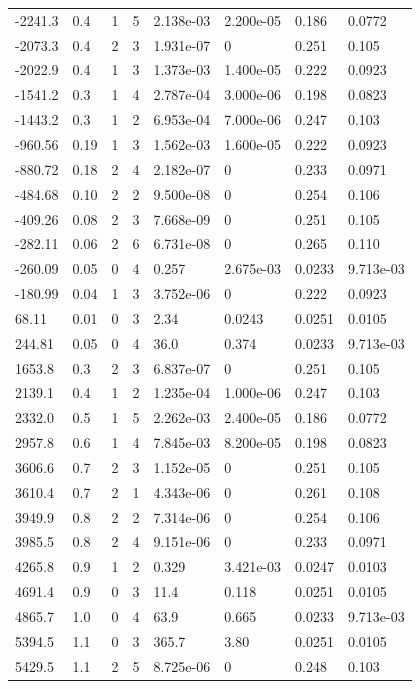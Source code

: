 \documentclass[preview]{standalone}
\begin{document}
{{\begin{tabular}{L{1.2cm}C{1.2cm} C{0.3cm}C{0.5cm} C{1.4cm}C{1.4cm} C{1.4cm}C{1.4cm}}
  -2241.3  &   0.4  & 1     &  5 &  2.138e-03  & 2.200e-05  & 0.186 &  0.0772   \\ 
  -2073.3  &   0.4  & 2     &  3 &  1.931e-07  & 0  & 0.251 &  0.105   \\ 
  -2022.9  &   0.4  & 1     &  3 &  1.373e-03  & 1.400e-05  & 0.222 &  0.0923   \\ 
  -1541.2  &   0.3  & 1     &  4 &  2.787e-04  & 3.000e-06  & 0.198 &  0.0823   \\ 
  -1443.2  &   0.3  & 1     &  2 &  6.953e-04  & 7.000e-06  & 0.247 &  0.103   \\ 
  -960.56  &  0.19  & 1     &  3 &  1.562e-03  & 1.600e-05  & 0.222 &  0.0923   \\ 
  -880.72  &  0.18  & 2     &  4 &  2.182e-07  & 0  & 0.233 &  0.0971   \\ 
  -484.68  &  0.10  & 2     &  2 &  9.500e-08  & 0  & 0.254 &  0.106   \\ 
  -409.26  &  0.08  & 2     &  3 &  7.668e-09  & 0  & 0.251 &  0.105   \\ 
  -282.11  &  0.06  & 2     &  6 &  6.731e-08  & 0  & 0.265 &  0.110   \\ 
  -260.09  &  0.05  & 0     &  4 &  0.257  & 2.675e-03  & 0.0233 &  9.713e-03   \\ 
  -180.99  &  0.04  & 1     &  3 &  3.752e-06  & 0  & 0.222 &  0.0923   \\ 
  68.11  &  0.01  & 0     &  3 &  2.34  & 0.0243  & 0.0251 &  0.0105   \\ 
  244.81  &  0.05  & 0     &  4 &  36.0  & 0.374  & 0.0233 &  9.713e-03   \\ 
  1653.8  &   0.3  & 2     &  3 &  6.837e-07  & 0  & 0.251 &  0.105   \\ 
  2139.1  &   0.4  & 1     &  2 &  1.235e-04  & 1.000e-06  & 0.247 &  0.103   \\ 
  2332.0  &   0.5  & 1     &  5 &  2.262e-03  & 2.400e-05  & 0.186 &  0.0772   \\ 
  2957.8  &   0.6  & 1     &  4 &  7.845e-03  & 8.200e-05  & 0.198 &  0.0823   \\ 
  3606.6  &   0.7  & 2     &  3 &  1.152e-05  & 0  & 0.251 &  0.105   \\ 
  3610.4  &   0.7  & 2     &  1 &  4.343e-06  & 0  & 0.261 &  0.108   \\ 
  3949.9  &   0.8  & 2     &  2 &  7.314e-06  & 0  & 0.254 &  0.106   \\ 
  3985.5  &   0.8  & 2     &  4 &  9.151e-06  & 0  & 0.233 &  0.0971   \\ 
  4265.8  &   0.9  & 1     &  2 &  0.329  & 3.421e-03  & 0.0247 &  0.0103   \\ 
  4691.4  &   0.9  & 0     &  3 &  11.4  & 0.118  & 0.0251 &  0.0105   \\ 
  4865.7  &   1.0  & 0     &  4 &  63.9  & 0.665  & 0.0233 &  9.713e-03   \\ 
  5394.5  &   1.1  & 0     &  3 &  365.7  & 3.80  & 0.0251 &  0.0105   \\ 
  5429.5  &   1.1  & 2     &  5 &  8.725e-06  & 0  & 0.248 &  0.103   \\ 
\hline 
\end{tabular} 

}}
\end{document}
